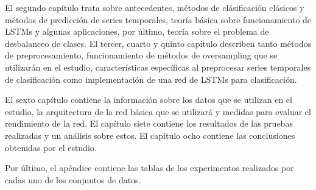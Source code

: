 El segundo capítulo trata sobre antecedentes, métodos de clásificación clásicos y métodos de predicción de series temporales, teoría básica sobre funcionamiento de LSTMs y algunas aplicaciones, por último, teoría sobre el problema de desbalanceo de clases.\newline
\newpage
El tercer, cuarto y quinto capítulo describen tanto métodos de preprocesamiento, funcionamiento de métodos de oversampling que se utilizarán en el estudio, características específicas al preprocesar series temporales de clasificación  como implementación de una red de LSTMs para clasificación.\newline

El sexto capítulo contiene la información sobre los datos que se utilizan en el estudio, la arquitectura de la red básica que se utilizará y medidas para evaluar el rendimiento de la red. El capítulo siete contiene los resultados de las pruebas realizadas y un análisis sobre estos. El capítulo ocho contiene las conclusiones obtenidas por el estudio.\newline

Por último, el apéndice contiene las tablas de los experimentos realizados por cadas uno de los conjuntos de datos.